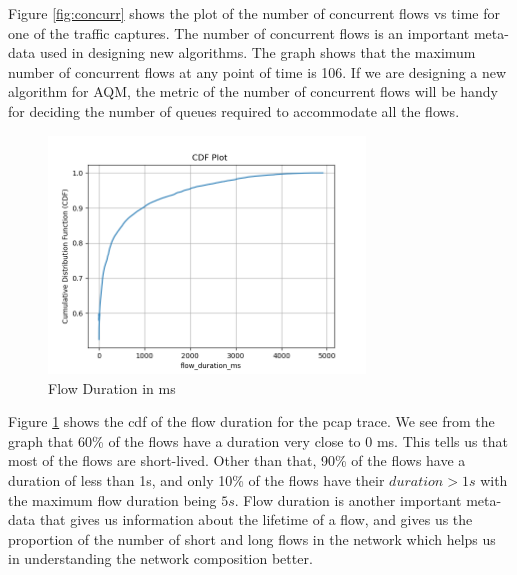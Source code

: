 Figure \ref{fig:concurr} shows the plot of the number of concurrent flows vs time for one of the traffic captures. The number of concurrent flows is an important meta-data used in designing new algorithms. The graph shows that the maximum number of concurrent flows at any point of time is 106. If we are designing a new algorithm for AQM, the metric of the number of concurrent flows will be handy for deciding the number of queues required to accommodate all the flows.

\begin{figure}[t]
    \centering
        \includegraphics[width=0.75\textwidth]{Figures/flow_duration_cdf.png}
    \caption[Flow duration in ms]{Flow Duration in ms}
    \label{fig:dur}
    \bigskip
\end{figure}

Figure \ref{fig:dur} shows the cdf of the flow duration for the pcap trace. We see from the graph that 60\% of the flows have a duration very close to 0 ms. This tells us that most of the flows are short-lived. Other than that, 90\% of the flows have a duration of less than 1s, and only 10\% of the flows have their  \( duration > 1s \)  with the maximum flow duration being $5s$. Flow duration is another important meta-data that gives us information about the lifetime of a flow, and gives us the proportion of the number of short and long flows in the network which helps us in understanding the network composition better.

